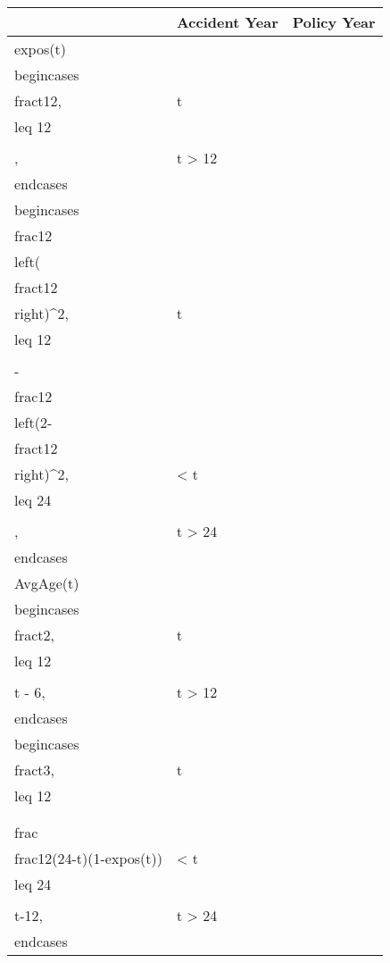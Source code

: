 \documentclass[
]{article}
\begin{document}
\begin{longtable}[]{@{}
  >{\raggedright\arraybackslash}p{}
  >{\raggedright\arraybackslash}p{}
  >{\raggedright\arraybackslash}p{}@{}}
\toprule\noalign{}
\begin{minipage}[b]{\linewidth}\raggedright
\end{minipage} & \begin{minipage}[b]{\linewidth}\raggedright
Accident Year
\end{minipage} & \begin{minipage}[b]{\linewidth}\raggedright
Policy Year
\end{minipage} \\
\midrule\noalign{}
\endhead
\bottomrule\noalign{}
\endlastfoot
expos(t) &
\(\\begin{cases} \\frac{t}{12}, & t \\leq 12 \\\\ 1, & t > 12 \\end{cases}\)
&
\(\\begin{cases} \\frac{1}{2}\\left(\\frac{t}{12}\\right)^2, & t \\leq 12 \\\\ 1-\\frac{1}{2}\\left(2-\\frac{t}{12}\\right)^2, & 12 < t \\leq 24 \\\\ 1, & t > 24 \\end{cases}\) \\
AvgAge(t) &
\(\\begin{cases} \\frac{t}{2}, & t \\leq 12 \\\\ t - 6, & t > 12 \\end{cases}\)
&
\(\\begin{cases} \\frac{t}{3}, & t \\leq 12 \\\\ \\frac{(t-12)+\\frac{1}{2}(24-t)(1-expos(t))}{expos(t)}, & 12 < t \\leq 24 \\\\ t-12, & t > 24 \\end{cases}\) \\
\end{longtable}
\end{document}
